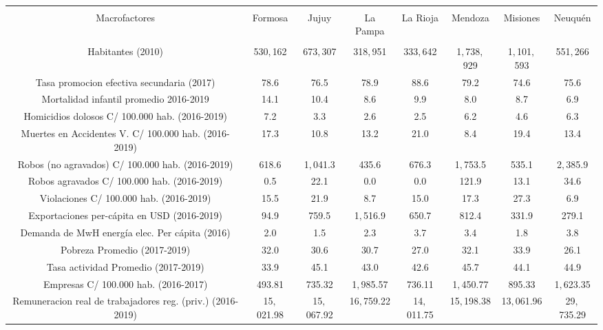 \documentclass[12pt,a4paper]{article}
\begin{document}
\begin{table} \centering \tiny
 \centering 
  \caption{} 

\begin{tabular}{@{\extracolsep{5pt}} cccccccc} 
\\[-1.8ex]\hline 
\hline \\[-1.8ex] 
Macrofactores & Formosa & Jujuy & La Pampa & La Rioja & Mendoza & Misiones & Neuquén \\ 
\hline \\[-1.8ex] 
Habitantes (2010) &   530$,$162 &   673$,$307 &   318$,$951 &   333$,$642 &  1$,$738$,$929 &  1$,$101$,$593 &   551$,$266 \\ 
Tasa promocion efectiva secundaria (2017) & 78.6 & 76.5 & 78.9 & 88.6 & 79.2 & 74.6 & 75.6 \\ 
Mortalidad infantil promedio 2016-2019 & 14.1 & 10.4 &  8.6 &  9.9 &  8.0 &  8.7 &  6.9 \\ 
Homicidios dolosos C/ 100.000 hab. (2016-2019) & 7.2 & 3.3 & 2.6 & 2.5 & 6.2 & 4.6 & 6.3 \\ 
Muertes en Accidentes V. C/ 100.000  hab.  (2016-2019) & 17.3 & 10.8 & 13.2 & 21.0 &  8.4 & 19.4 & 13.4 \\ 
Robos (no agravados) C/ 100.000 hab. (2016-2019) &  618.6 & 1$,$041.3 &  435.6 &  676.3 & 1$,$753.5 &  535.1 & 2$,$385.9 \\ 
Robos agravados C/ 100.000 hab. (2016-2019) &   0.5 &  22.1 &   0.0 &   0.0 & 121.9 &  13.1 &  34.6 \\ 
Violaciones  C/ 100.000 hab. (2016-2019) & 15.5 & 21.9 &  8.7 & 15.0 & 17.3 & 27.3 &  6.9 \\ 
Exportaciones per-cápita en USD (2016-2019) &   94.9 &  759.5 & 1$,$516.9 &  650.7 &  812.4 &  331.9 &  279.1 \\ 
Demanda de MwH energía elec. Per cápita (2016) & 2.0 & 1.5 & 2.3 & 3.7 & 3.4 & 1.8 & 3.8 \\ 
Pobreza Promedio (2017-2019) & 32.0 & 30.6 & 30.7 & 27.0 & 32.1 & 33.9 & 26.1 \\ 
Tasa actividad Promedio (2017-2019) & 33.9 & 45.1 & 43.0 & 42.6 & 45.7 & 44.1 & 44.9 \\ 
Empresas  C/ 100.000 hab. (2016-2017) &  493.81 &  735.32 & 1$,$985.57 &  736.11 & 1$,$450.77 &  895.33 & 1$,$623.35 \\ 
Remuneracion  real de trabajadores reg. (priv.) (2016-2019) & 15$,$021.98 & 15$,$067.92 & 16$,$759.22 & 14$,$011.75 & 15$,$198.38 & 13$,$061.96 & 29$,$735.29 \\ 

\end{tabular}
\end{table}
\end{document}
